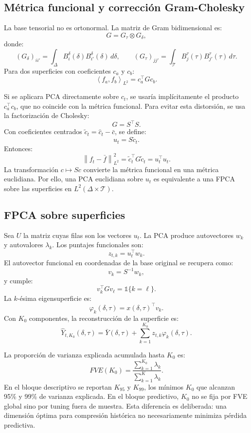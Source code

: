\documentclass[a4paper,11pt]{article}
\newcommand{\norm}[1]{\left\lVert #1 \right\rVert}
\newcommand{\inner}[2]{\left\langle #1,#2 \right\rangle}
\begin{document}
\subsection{Métrica funcional y corrección Gram-Cholesky}

La base tensorial no es ortonormal. La matriz de Gram bidimensional es:
\[
  G=G_\tau\otimes G_\delta,
\]
donde:
\[
  (G_\delta)_{ii'}=\int_{\Delta}B_i^\delta(\delta)B_{i'}^\delta(\delta)\,d\delta,
  \qquad
  (G_\tau)_{jj'}=\int_{\mathcal{T}}B_j^\tau(\tau)B_{j'}^\tau(\tau)\,d\tau.
\]
Para dos superficies con coeficientes \(c_a\) y \(c_b\):
\[
  \inner{f_a}{f_b}_{L^2}=c_a^\top G c_b.
\]

Si se aplicara PCA directamente sobre \(c_t\), se usaría implícitamente el producto \(c_a^\top c_b\), que no coincide con la métrica funcional. Para evitar esta distorsión, se usa la factorización de Cholesky:
\[
  G=S^\top S.
\]
Con coeficientes centrados \(\widetilde c_t=\widehat c_t-\bar c\), se define:
\[
  u_t=S\widetilde c_t.
\]
Entonces:
\[
  \norm{f_t-\bar f}_{L^2}^2
  =
  \widetilde c_t^\top G\widetilde c_t
  =
  u_t^\top u_t.
\]
La transformación \(c\mapsto Sc\) convierte la métrica funcional en una métrica euclidiana. Por ello, una PCA euclidiana sobre \(u_t\) es equivalente a una FPCA sobre las superficies en \(L^2(\Delta\times \mathcal{T})\).

\subsection{FPCA sobre superficies}

Sea \(U\) la matriz cuyas filas son los vectores \(u_t\). La PCA produce autovectores \(w_k\) y autovalores \(\lambda_k\). Los puntajes funcionales son:
\[
  z_{t,k}=u_t^\top w_k.
\]
El autovector funcional en coordenadas de la base original se recupera como:
\[
  v_k=S^{-1}w_k,
\]
y cumple:
\[
  v_k^\top Gv_\ell=\mathbb{1}\{k=\ell\}.
\]
La \(k\)-ésima eigensuperficie es:
\[
  \varphi_k(\delta,\tau)=x(\delta,\tau)^\top v_k.
\]
Con \(K_0\) componentes, la reconstrucción de la superficie es:
\[
  \widehat Y_{t,K_0}(\delta,\tau)
  =
  \bar Y(\delta,\tau)+\sum_{k=1}^{K_0}z_{t,k}\varphi_k(\delta,\tau).
\]

La proporción de varianza explicada acumulada hasta \(K_0\) es:
\[
  FVE(K_0)=\frac{\sum_{k=1}^{K_0}\lambda_k}{\sum_{k=1}^{K}\lambda_k}.
\]
En el bloque descriptivo se reportan \(K_{95}\) y \(K_{99}\), los mínimos \(K_0\) que alcanzan 95\% y 99\% de varianza explicada. En el bloque predictivo, \(K_0\) no se fija por FVE global sino por tuning fuera de muestra. Esta diferencia es deliberada: una dimensión óptima para compresión histórica no necesariamente minimiza pérdida predictiva.
\end{document}
